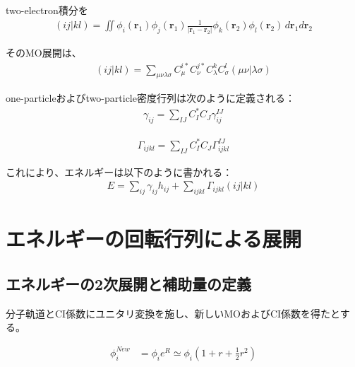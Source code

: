 \documentclass{article}
\begin{document}
two-electron積分を
\begin{equation}
\begin{split}
(ij|kl) = \iint \phi_i(\mathbf{r}_1) \phi_j(\mathbf{r}_1) \frac{1}{|\mathbf{r}_1 - \mathbf{r}_2|} \phi_k(\mathbf{r}_2) \phi_l(\mathbf{r}_2) \, d\mathbf{r}_1 d\mathbf{r}_2
\label{}
\end{split}
\end{equation}

そのMO展開は、
\begin{equation}
\begin{split}
(ij|kl) = \sum_{\mu\nu\lambda\sigma} C_{\mu}^{i *} C_{\nu}^{j *} C_{\lambda}^{k} C_{\sigma}^{l} (\mu\nu|\lambda\sigma)
\label{}
\end{split}
\end{equation}

one-particleおよびtwo-particle密度行列は次のように定義される：
\begin{equation}
\begin{split}
\gamma_{ij} = \sum_{IJ} C_I^* C_J \gamma_{ij}^{IJ}
\label{}
\end{split}
\end{equation}

\begin{equation}
\begin{split}
\Gamma_{ijkl} = \sum_{IJ} C_I^* C_J \Gamma_{ijkl}^{IJ}
\label{}
\end{split}
\end{equation}

これにより、エネルギーは以下のように書かれる：
\begin{equation}
\begin{split}
E = \sum_{ij} \gamma_{ij} h_{ij} +  \sum_{ijkl} \Gamma_{ijkl} (ij|kl)
\label{}
\end{split}
\end{equation}



\section*{エネルギーの回転行列による展開}
\subsection*{エネルギーの2次展開と補助量の定義}
分子軌道とCI係数にユニタリ変換を施し、新しいMOおよびCI係数を得たとする。

\begin{equation}
\begin{split}
\phi_i^{New} &= \phi_i e^R \simeq \phi_i \left(1 + r + \frac{1}{2} r^2\right)
\label{}
\end{split}
\end{equation}
\end{document}
